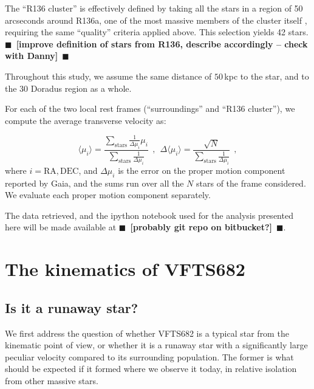 \documentclass{aa}
\newcommand{\todo}[1]{{\large $\blacksquare$~\textbf{\color{red}[#1]}}~$\blacksquare$}
\begin{document}
The ``R136 cluster'' is effectively defined by taking all the stars
in a region of 50 arcseconds around R136a, one of the most massive members of
the cluster itself \citep[][]{crowther:10}, requiring the same
``quality'' criteria applied above. This selection yields 42 stars.
\todo{improve definition of stars from R136, describe accordingly -- check with Danny}

Throughout this study, we assume the same distance of $50$\,kpc to the star, and to
the 30 Doradus region as a whole.%

For each of the two local rest frames (``surroundings'' and ``R136
cluster''), we compute the average transverse velocity as:

\begin{equation}
  \label{eq:mean}
  \langle \mu_i\rangle = \frac{\sum_\mathrm{stars}\frac{1}{\Delta
      \mu_i}\mu_i}{\sum_\mathrm{stars} \frac{1}{\Delta \mu_i}} \ \ , \
  \ \Delta \langle \mu_i\rangle = \frac{\sqrt{N}}{\sum_\mathrm{stars}
    \frac{1}{\Delta \mu_i}} \ \ ,
\end{equation}
where $i = \mathrm{RA}, \mathrm{DEC}$, and $\Delta \mu_i$ is the error
on the proper motion component reported by Gaia, and the sums run over
all the $N$ stars of the frame considered. We evaluate each proper motion
component separately. 

The data retrieved, and the ipython notebook used for the analysis
presented here will be made available at \todo{probably git repo on bitbucket?}. 

\section{The kinematics of VFTS682}
\label{sec:results}

\subsection{Is it a runaway star?}
\label{sec:runaway}
We first address the question of whether VFTS682 is a typical star
from the kinematic point of view, or whether it is a runaway star with
a significantly large peculiar velocity compared to its surrounding population. The former is what should
be expected if it formed where we observe it today, in relative
isolation from other massive stars.
\end{document}

